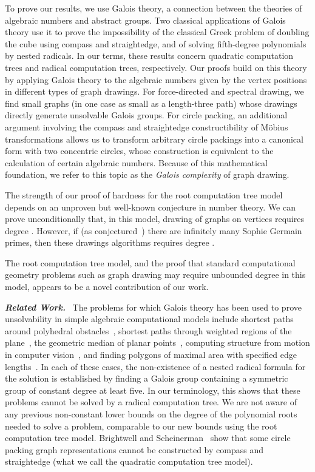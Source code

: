 \documentclass[oribibl,10pt]{llncs}
\newcommand{\Emph}[1]{\smallskip\textbf{\textit{#1}}~}
\begin{document}
To prove our results, we use Galois theory, a connection between the theories of algebraic numbers and abstract groups. 
Two classical applications of Galois theory use it to prove the impossibility of the classical Greek problem of doubling the cube using compass and straightedge, and of solving fifth-degree polynomials by nested radicals. In our terms, these results concern quadratic computation trees and radical computation trees, respectively. 
Our proofs build on this theory by applying Galois theory to the algebraic numbers given by the vertex positions in different types of graph drawings. For force-directed and spectral drawing, we find small graphs (in one case as small as a length-three path) whose drawings directly generate unsolvable Galois groups. For circle packing, an additional argument involving the compass and straightedge constructibility of M\"obius transformations allows us to transform arbitrary circle packings into a canonical form with two concentric circles, whose construction is equivalent to the calculation of certain algebraic numbers.
Because of this mathematical foundation, we refer to this topic as the 
\emph{Galois complexity} of graph drawing.

\ifFull
The strength of our proof of hardness for the root computation tree model depends on an unproven but well-known conjecture in number theory. We can prove unconditionally that, in this model, drawing of graphs on  vertices requires degree . However, if (as conjectured~\cite{Sho-CINTA-09}) there are infinitely many Sophie Germain primes, then these drawings algorithms requires degree .

The root computation tree model, and the proof that standard computational geometry problems such as graph drawing may require unbounded degree in this model, appears to be a novel contribution of our work.
\fi

\Emph{Related Work.}
The problems for which
Galois theory has been used to prove unsolvability in
simple algebraic computational models include
shortest paths around polyhedral obstacles~\cite{Baj-Pol-1985}, shortest paths through weighted regions of the plane~\cite{CarGriMah-2013},
the geometric median of planar points~\cite{Baj-DCG-1988},
computing structure from motion in computer vision~\cite{NisHarSte-CVPR-2007},
and finding polygons of maximal area with specified edge lengths~\cite{Var-SB-2004}.
In each of these cases, the non-existence of a nested radical formula for the solution is established by finding a Galois group containing a symmetric group of constant degree at least five. In our terminology, this shows that these problems cannot be solved by a radical computation tree.
We are not aware of any previous non-constant lower bounds on the degree of the polynomial roots needed to solve a problem, comparable to our new bounds using the root computation tree model.
Brightwell and Scheinerman~\cite{BriSch-SJDM-93} show that some 
circle packing graph representations cannot be constructed by compass and straightedge
(what we call the quadratic computation tree model).
\end{document}
